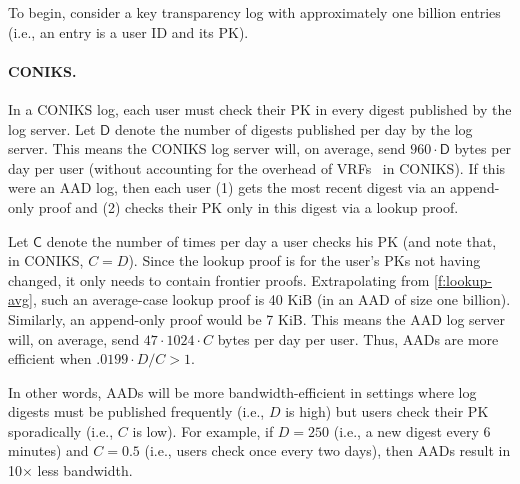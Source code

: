 To begin, consider a key transparency log with approximately one billion entries (i.e., an entry is a user ID and its PK).

\newcommand{\coniksfreq}{\ensuremath{\mathbf{\mathsf{D}}}\xspace}
\newcommand{\checkfreq}{\ensuremath{\mathbf{\mathsf{C}}}\xspace}

\paragraph{CONIKS.}
In a CONIKS log, each user must check their PK in every digest published by the log server.
Let \coniksfreq denote the number of digests published per day by the log server.
This means the CONIKS log server will, on average, send $960 \cdot \coniksfreq$ bytes per day per user (without accounting for the overhead of VRFs~\cite{vrf} in CONIKS).
If this were an AAD log, then each user (1) gets the most recent digest via an append-only proof and (2) checks their PK only in this digest via a lookup proof.

Let \checkfreq denote the number of times per day a user checks his PK (and note that, in CONIKS, $C = D$).
Since the lookup proof is for the user's PKs not having changed, it only needs to contain frontier proofs.
Extrapolating from \cref{f:lookup-avg}, such an average-case lookup proof is 40 KiB (in an AAD of size one billion).
Similarly, an append-only proof would be 7 KiB.
This means the AAD log server will, on average, send $47 \cdot 1024 \cdot C$ bytes per day per user.
Thus, AADs are more efficient when $.0199 \cdot D / C > 1$.

In other words, AADs will be more bandwidth-efficient in settings where log digests must be published frequently (i.e., $D$ is high) but users check their PK sporadically (i.e., $C$ is low).
For example, if $D=250$ (i.e., a new digest every 6 minutes) and $C=0.5$ (i.e., users check once every two days), then AADs result in 10$\times$ less bandwidth.

